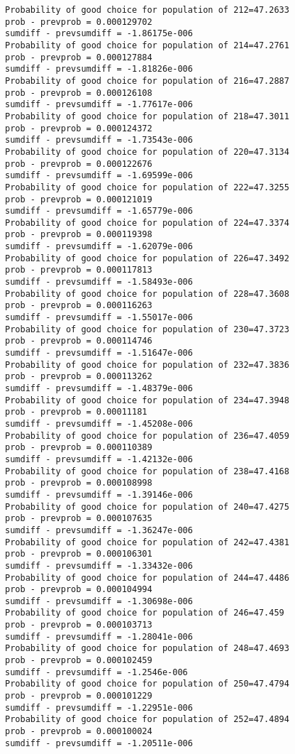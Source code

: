 \documentclass[11pt,onecolumn]{article}
\begin{document}
\begin{verbatim}
Probability of good choice for population of 212=47.2633
prob - prevprob = 0.000129702
sumdiff - prevsumdiff = -1.86175e-006
Probability of good choice for population of 214=47.2761
prob - prevprob = 0.000127884
sumdiff - prevsumdiff = -1.81826e-006
Probability of good choice for population of 216=47.2887
prob - prevprob = 0.000126108
sumdiff - prevsumdiff = -1.77617e-006
Probability of good choice for population of 218=47.3011
prob - prevprob = 0.000124372
sumdiff - prevsumdiff = -1.73543e-006
Probability of good choice for population of 220=47.3134
prob - prevprob = 0.000122676
sumdiff - prevsumdiff = -1.69599e-006
Probability of good choice for population of 222=47.3255
prob - prevprob = 0.000121019
sumdiff - prevsumdiff = -1.65779e-006
Probability of good choice for population of 224=47.3374
prob - prevprob = 0.000119398
sumdiff - prevsumdiff = -1.62079e-006
Probability of good choice for population of 226=47.3492
prob - prevprob = 0.000117813
sumdiff - prevsumdiff = -1.58493e-006
Probability of good choice for population of 228=47.3608
prob - prevprob = 0.000116263
sumdiff - prevsumdiff = -1.55017e-006
Probability of good choice for population of 230=47.3723
prob - prevprob = 0.000114746
sumdiff - prevsumdiff = -1.51647e-006
Probability of good choice for population of 232=47.3836
prob - prevprob = 0.000113262
sumdiff - prevsumdiff = -1.48379e-006
Probability of good choice for population of 234=47.3948
prob - prevprob = 0.00011181
sumdiff - prevsumdiff = -1.45208e-006
Probability of good choice for population of 236=47.4059
prob - prevprob = 0.000110389
sumdiff - prevsumdiff = -1.42132e-006
Probability of good choice for population of 238=47.4168
prob - prevprob = 0.000108998
sumdiff - prevsumdiff = -1.39146e-006
Probability of good choice for population of 240=47.4275
prob - prevprob = 0.000107635
sumdiff - prevsumdiff = -1.36247e-006
Probability of good choice for population of 242=47.4381
prob - prevprob = 0.000106301
sumdiff - prevsumdiff = -1.33432e-006
Probability of good choice for population of 244=47.4486
prob - prevprob = 0.000104994
sumdiff - prevsumdiff = -1.30698e-006
Probability of good choice for population of 246=47.459
prob - prevprob = 0.000103713
sumdiff - prevsumdiff = -1.28041e-006
Probability of good choice for population of 248=47.4693
prob - prevprob = 0.000102459
sumdiff - prevsumdiff = -1.2546e-006
Probability of good choice for population of 250=47.4794
prob - prevprob = 0.000101229
sumdiff - prevsumdiff = -1.22951e-006
Probability of good choice for population of 252=47.4894
prob - prevprob = 0.000100024
sumdiff - prevsumdiff = -1.20511e-006

\end{verbatim}
\end{document}
